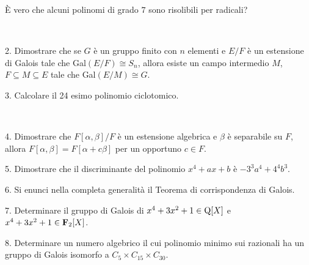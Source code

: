  \`E vero che alcuni polinomi di grado $7$ sono risolibili per radicali?\medskip\bigskip\bigskip

\ \dotfill\ \bigskip\bigskip\bigskip


\vfil\eject


\item{2.} Dimostrare che se $G$ \`e un gruppo finito con $n$ elementi e $E/F$ \`e
un estensione di Galois tale che Gal$(E/F)\cong S_n$, allora esiste un campo intermedio
$M$, $F\subseteq M\subseteq E$ tale che Gal$(E/M)\cong G$.\vv


\item{3.} Calcolare il 24 esimo polinomio ciclotomico. 

\ve\ \vs


\item{4.} Dimostrare che $F[\alpha,\beta]/F$ \`e un estensione algebrica e $\beta$ \`e
separabile su $F$, allora $F[\alpha,\beta]=F[\alpha+c\beta]$ per un opportuno $c\in F$. \vv

\item{5.} Dimostrare che il discriminante del polinomio $x^4+ax+b$ \`e $-3^3a^4+4^4b^3$.
\ve\ \vs


\item{6.} Si enunci nella completa generalit\`a il Teorema di
corrispondenza di Galois.\vv\vv


\item{7.} Determinare il gruppo di Galois di $x^4+3x^2+1\in{\rm Q}[X]$ e $x^4+3x^2+1\in{\bf F}_2[X]$. \vv\vv

\item{8.} Determinare un numero algebrico il cui polinomio minimo sui razionali ha un gruppo di 
Galois isomorfo a $C_5\times C_{15} \times C_{30}$.

\vv



\ \vst
 \bye
